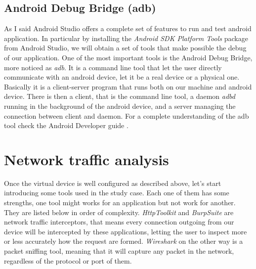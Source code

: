 		\subsection{Android Debug Bridge (adb)}
			\par As I said Android Studio offers a complete set of features to run and test android application. In particular by installing the \textit{Android SDK Platform Tools} package from Android Studio, we will obtain a set of tools that make possible the debug of our application. \newline
			One of the most important tools is the Android Debug Bridge, more noticed as \textit{adb}. It is a command line tool that let the user directly communicate with an android device, let it be a real device or a physical one. Basically it is a client-server program that runs both on our machine and android device. There is then a client, that is the command line tool, a daemon \textit{adbd} running in the background of the android device, and a server managing the connection between client and daemon. For a complete understanding of the adb tool check the Android Developer guide \cite{adb}.
		
	\section{Network traffic analysis}
		\par Once the virtual device is well configured as described above, let's start introducing some tools used in the study case. Each one of them has some strengths, one tool might works for an application but not work for another. They are listed below in order of complexity. \textit{HttpToolkit} and \textit{BurpSuite} are network traffic interceptors, that means every connection outgoing from our device will be intercepted by these applications, letting the user to inspect more or less accurately how the request are formed. \textit{Wireshark} on the other way is a packet sniffing tool, meaning that it will capture any packet in the network, regardless of the protocol or port of them. 
		

